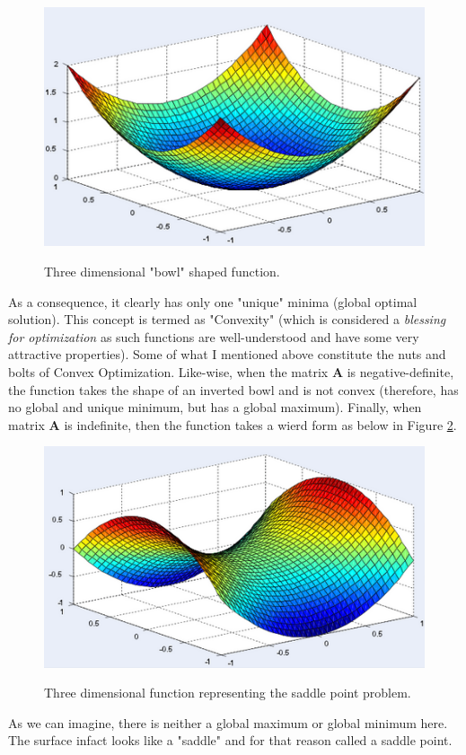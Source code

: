 \documentclass[a4paper]{article}
\begin{document}
\begin{figure}[!htb]\label{fig:BowlFunction}
  \centering
  \includegraphics[width=0.5\columnwidth]{Convex_Function}\\
  \caption{Three dimensional "bowl" shaped function.}\label{fig:BowlFunction}
\end{figure}
\noindent As a consequence, it clearly has only one "unique" minima (global optimal solution). This concept is termed as "Convexity" (which is considered a {\it blessing for optimization} as such functions are well-understood and have some very attractive properties). Some of what I mentioned above constitute the nuts and bolts of Convex Optimization. Like-wise, when the matrix $\mathbf{A}$ is negative-definite, the function takes the shape of an inverted bowl and is not convex (therefore, has no global and unique minimum, but has a global maximum). Finally, when matrix $\mathbf{A}$ is indefinite, then the function takes a wierd form as below in Figure \ref{fig:SaddlePointFunction}.
\begin{figure}[!htb]\label{fig:SaddlePointFunction}
  \centering
  \includegraphics[width=0.5\columnwidth]{SaddlePoint_Function}\\
  \caption{Three dimensional function representing the saddle point problem.}\label{fig:SaddlePointFunction}
\end{figure}
As we can imagine, there is neither a global maximum or global minimum here. The surface infact looks like a "saddle" and for that reason called a saddle point.
\end{document}
